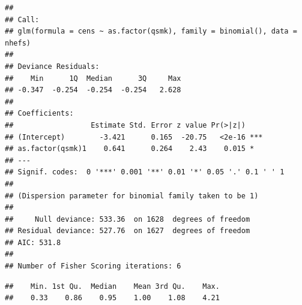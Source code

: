 \documentclass[
  10pt,
]{book}
\newenvironment{Shaded}{\begin{snugshade}}{\end{snugshade}}
\newcommand{\AttributeTok}[1]{\textcolor[rgb]{0.77,0.63,0.00}{#1}}
\newcommand{\DecValTok}[1]{\textcolor[rgb]{0.00,0.00,0.81}{#1}}
\newcommand{\FunctionTok}[1]{\textcolor[rgb]{0.00,0.00,0.00}{#1}}
\newcommand{\NormalTok}[1]{#1}
\newcommand{\OtherTok}[1]{\textcolor[rgb]{0.56,0.35,0.01}{#1}}
\newcommand{\SpecialCharTok}[1]{\textcolor[rgb]{0.00,0.00,0.00}{#1}}
\newcommand{\StringTok}[1]{\textcolor[rgb]{0.31,0.60,0.02}{#1}}
\begin{document}
\begin{verbatim}
## 
## Call:
## glm(formula = cens ~ as.factor(qsmk), family = binomial(), data = nhefs)
## 
## Deviance Residuals: 
##    Min      1Q  Median      3Q     Max  
## -0.347  -0.254  -0.254  -0.254   2.628  
## 
## Coefficients:
##                  Estimate Std. Error z value Pr(>|z|)    
## (Intercept)        -3.421      0.165  -20.75   <2e-16 ***
## as.factor(qsmk)1    0.641      0.264    2.43    0.015 *  
## ---
## Signif. codes:  0 '***' 0.001 '**' 0.01 '*' 0.05 '.' 0.1 ' ' 1
## 
## (Dispersion parameter for binomial family taken to be 1)
## 
##     Null deviance: 533.36  on 1628  degrees of freedom
## Residual deviance: 527.76  on 1627  degrees of freedom
## AIC: 531.8
## 
## Number of Fisher Scoring iterations: 6
\end{verbatim}

\begin{Shaded}
\end{Shaded}

\begin{verbatim}
##    Min. 1st Qu.  Median    Mean 3rd Qu.    Max. 
##    0.33    0.86    0.95    1.00    1.08    4.21
\end{verbatim}

\begin{Shaded}
\end{Shaded}
\end{document}
